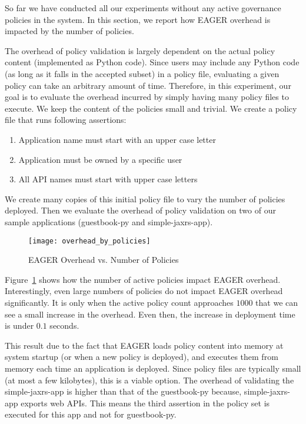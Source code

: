 So far we have conducted all our experiments without any active governance 
policies in the system. In this section, we report how EAGER overhead
is impacted by the number of policies.

The overhead of policy validation is largely dependent on the actual policy
content (implemented as Python code). Since users may include any Python code 
(as long as it falls in the accepted subset) in a policy file, evaluating a
given policy can take an arbitrary amount of time.  Therefore, in this
experiment, our goal is to evaluate the overhead incurred by simply having
many policy files to execute. We keep the content of the policies small and
trivial. We create a policy file that runs following assertions:
\begin{enumerate} 
\vspace{0.05in}
\item Application name must start with an upper case letter
\vspace{0.05in}
\item Application must be owned by a specific user 
\vspace{0.05in}
\item All API names must start with upper case letters 
\vspace{0.05in}
\end{enumerate} We create many copies of this
initial policy file to vary the number of policies deployed. Then we evaluate
the overhead of policy validation on two of our sample applications
(guestbook-py and simple-jaxrs-app). 

\begin{figure}
\centering
\texttt{[image: overhead\_by\_policies]}
\caption{EAGER Overhead vs. Number of Policies}
\label{fig:overhead_by_policies}
\end{figure}

Figure~\ref{fig:overhead_by_policies} shows how the number of active policies
impact EAGER overhead. Interestingly, even large numbers of policies 
do not impact EAGER overhead significantly. It is only when the active
policy count approaches $1000$ that we can see a small increase in the
overhead. Even then, the increase in deployment time is under $0.1$ seconds. 

This result due to the fact that EAGER loads policy content into memory at system
startup (or when a new policy is deployed), and executes them from memory each
time an application is deployed. Since policy files are typically small (at
most a few kilobytes), this is a viable option. The overhead of validating the
simple-jaxrs-app is higher than that of the guestbook-py because,
simple-jaxrs-app exports web APIs. This means the third assertion in the
policy set is executed for this app and not for guestbook-py. 

